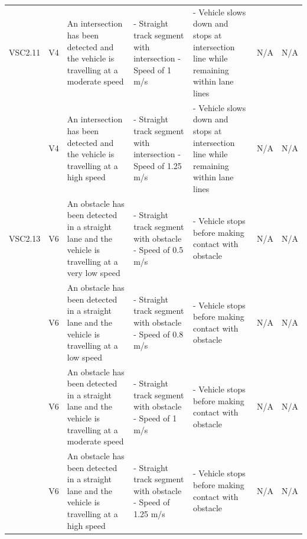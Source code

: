 \documentclass [10pt]{article}
\begin{document}
\begin{longtable}{ | p{ } | p{ } |  p{ } |  p{ } | p{ } | p{ } |  p{ } |}
    \multicolumn{1}{|c|}{VSC2.11} 
    & \multicolumn{1}{c|}{V4}
    & An intersection has been detected and the vehicle is travelling at a moderate speed
    & - Straight track segment with intersection \newline - Speed of 1 m/s
    & - Vehicle slows down and stops at intersection line while remaining within lane lines
    & N/A
    & \multicolumn{1}{c|}{N/A}\\
    
    \rowcolor{tableCell}\multicolumn{1}{|c|}{VSC2.12} 
    & \multicolumn{1}{c|}{V4}
    & An intersection has been detected and the vehicle is travelling at a high speed
    & - Straight track segment with intersection \newline - Speed of 1.25 m/s
    & - Vehicle slows down and stops at intersection line while remaining within lane lines
    & N/A
    & \multicolumn{1}{c|}{N/A}\\
    
    \multicolumn{1}{|c|}{VSC2.13} 
    & \multicolumn{1}{c|}{V6}
    & An obstacle has been detected in a straight lane and the vehicle is travelling at a very low speed
    & - Straight track segment with obstacle \newline - Speed of 0.5 m/s
    & - Vehicle stops before making contact with obstacle
    & N/A
    & \multicolumn{1}{c|}{N/A}\\ 
    
    \rowcolor{tableCell}\multicolumn{1}{|c|}{VSC2.14} 
    & \multicolumn{1}{c|}{V6}
    & An obstacle has been detected in a straight lane and the vehicle is travelling at a low speed
    & - Straight track segment with obstacle \newline - Speed of 0.8 m/s
    & - Vehicle stops before making contact with obstacle
    & N/A
    & \multicolumn{1}{c|}{N/A}\\  \hline
    
    \newpage \hline
    
    \multicolumn{1}{|c|}{VSC2.15} 
    & \multicolumn{1}{c|}{V6}
    & An obstacle has been detected in a straight lane and the vehicle is travelling at a moderate speed
    & - Straight track segment with obstacle \newline - Speed of 1 m/s
    & - Vehicle stops before making contact with obstacle
    & N/A
    & \multicolumn{1}{c|}{N/A}\\
    
    \rowcolor{tableCell}\multicolumn{1}{|c|}{VSC2.16} 
    & \multicolumn{1}{c|}{V6}
    & An obstacle has been detected in a straight lane and the vehicle is travelling at a high speed
    & - Straight track segment with obstacle \newline - Speed of 1.25 m/s
    & - Vehicle stops before making contact with obstacle
    & N/A
    & \multicolumn{1}{c|}{N/A}\\
    

\end{longtable}
\end{document}
